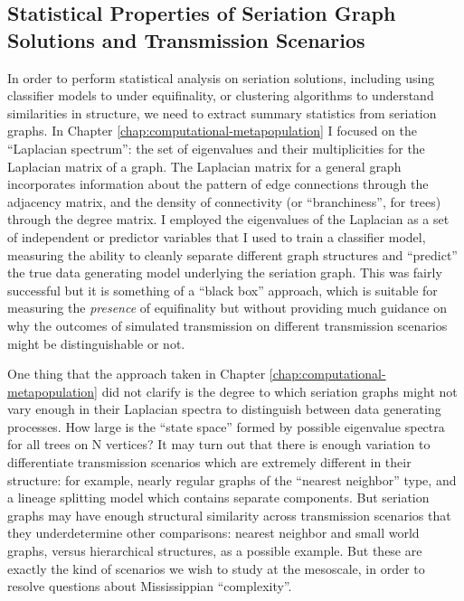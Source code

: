 \subsection{Statistical Properties of Seriation Graph Solutions and Transmission Scenarios}\label{conc:sec:future-seriation-structure}

In order to perform statistical analysis on seriation solutions, including using classifier models to under equifinality, or clustering algorithms to understand similarities in structure, we need to extract summary statistics from seriation graphs.  In Chapter \ref{chap:computational-metapopulation} I focused on the ``Laplacian spectrum'':  the set of eigenvalues and their multiplicities for the Laplacian matrix of a graph.  The Laplacian matrix for a general graph incorporates information about the pattern of edge connections through the adjacency matrix, and the density of connectivity (or ``branchiness'', for trees) through the degree matrix.  I employed the eigenvalues of the Laplacian as a set of independent or predictor variables that I used to train a classifier model, measuring the ability to cleanly separate different graph structures and ``predict'' the true data generating model underlying the seriation graph.  This was fairly successful but it is something of a ``black box'' approach, which is suitable for measuring the \emph{presence} of equifinality but without providing much guidance on why the outcomes of simulated transmission on different transmission scenarios might be distinguishable or not.  

One thing that the approach taken in Chapter \ref{chap:computational-metapopulation} did not clarify is the degree to which seriation graphs might not vary enough in their Laplacian spectra to distinguish between data generating processes.  How large is the ``state space'' formed by possible eigenvalue spectra for all trees on N vertices?  It may turn out that there is enough variation to differentiate transmission scenarios which are extremely different in their structure:  for example, nearly regular graphs of the ``nearest neighbor'' type, and a lineage splitting model which contains separate components.  But seriation graphs may have enough structural similarity across transmission scenarios that they underdetermine other comparisons:  nearest neighbor and small world graphs, versus hierarchical structures, as a possible example.  But these are exactly the kind of scenarios we wish to study at the mesoscale, in order to resolve questions about Mississippian ``complexity''.  

